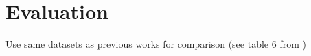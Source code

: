 
\section{Evaluation}\label{sec:evaluation}

 
 Use same datasets as previous works for comparison (see table 6 from \citep{consonni})

